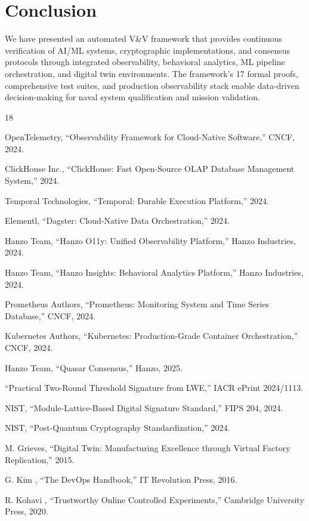 \documentclass[11pt,letterpaper]{article}
\begin{document}
\section{Conclusion}

We have presented an automated V\&V framework that provides continuous verification of AI/ML systems, cryptographic implementations, and consensus protocols through integrated observability, behavioral analytics, ML pipeline orchestration, and digital twin environments. The framework's 17 formal proofs, comprehensive test suites, and production observability stack enable data-driven decision-making for naval system qualification and mission validation.

\begin{thebibliography}{18}

 OpenTelemetry, ``Observability Framework for Cloud-Native Software,'' CNCF, 2024.

 ClickHouse Inc., ``ClickHouse: Fast Open-Source OLAP Database Management System,'' 2024.

 Temporal Technologies, ``Temporal: Durable Execution Platform,'' 2024.

 Elementl, ``Dagster: Cloud-Native Data Orchestration,'' 2024.

 Hanzo Team, ``Hanzo O11y: Unified Observability Platform,'' Hanzo Industries, 2024.

 Hanzo Team, ``Hanzo Insights: Behavioral Analytics Platform,'' Hanzo Industries, 2024.

 Prometheus Authors, ``Prometheus: Monitoring System and Time Series Database,'' CNCF, 2024.

 Kubernetes Authors, ``Kubernetes: Production-Grade Container Orchestration,'' CNCF, 2024.

 Hanzo Team, ``Quasar Consensus,'' Hanzo, 2025.

 ``Practical Two-Round Threshold Signature from LWE,'' IACR ePrint 2024/1113.

 NIST, ``Module-Lattice-Based Digital Signature Standard,'' FIPS 204, 2024.

 NIST, ``Post-Quantum Cryptography Standardization,'' 2024.

 M. Grieves, ``Digital Twin: Manufacturing Excellence through Virtual Factory Replication,'' 2015.

 G. Kim \etal, ``The DevOps Handbook,'' IT Revolution Press, 2016.

 R. Kohavi \etal, ``Trustworthy Online Controlled Experiments,'' Cambridge University Press, 2020.

\end{thebibliography}
\end{document}
